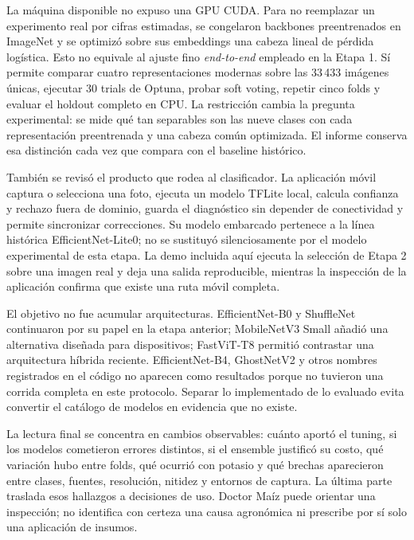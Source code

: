 La máquina disponible no expuso una GPU CUDA. Para no reemplazar un experimento
real por cifras estimadas, se congelaron backbones preentrenados en ImageNet y
se optimizó sobre sus embeddings una cabeza lineal de pérdida logística. Esto
no equivale al ajuste fino \emph{end-to-end} empleado en la Etapa 1. Sí permite
comparar cuatro representaciones modernas sobre las 33\,433 imágenes únicas,
ejecutar 30 trials de Optuna, probar soft voting, repetir cinco folds y evaluar
el holdout completo en CPU. La restricción cambia la pregunta experimental:
se mide qué tan separables son las nueve clases con cada representación
preentrenada y una cabeza común optimizada. El informe conserva esa distinción
cada vez que compara con el baseline histórico.

También se revisó el producto que rodea al clasificador. La aplicación móvil
captura o selecciona una foto, ejecuta un modelo TFLite local, calcula
confianza y rechazo fuera de dominio, guarda el diagnóstico sin depender de
conectividad y permite sincronizar correcciones. Su modelo embarcado pertenece
a la línea histórica EfficientNet-Lite0; no se sustituyó silenciosamente por el
modelo experimental de esta etapa. La demo incluida aquí ejecuta la selección
de Etapa 2 sobre una imagen real y deja una salida reproducible, mientras la
inspección de la aplicación confirma que existe una ruta móvil completa.

El objetivo no fue acumular arquitecturas. EfficientNet-B0 y ShuffleNet
continuaron por su papel en la etapa anterior; MobileNetV3 Small añadió una
alternativa diseñada para dispositivos; FastViT-T8 permitió contrastar una
arquitectura híbrida reciente. EfficientNet-B4, GhostNetV2 y otros nombres
registrados en el código no aparecen como resultados porque no tuvieron una
corrida completa en este protocolo. Separar lo implementado de lo evaluado
evita convertir el catálogo de modelos en evidencia que no existe.

La lectura final se concentra en cambios observables: cuánto aportó el tuning,
si los modelos cometieron errores distintos, si el ensemble justificó su costo,
qué variación hubo entre folds, qué ocurrió con potasio y qué brechas aparecieron
entre clases, fuentes, resolución, nitidez y entornos de captura. La última
parte traslada esos hallazgos a decisiones de uso. Doctor Maíz puede orientar
una inspección; no identifica con certeza una causa agronómica ni prescribe por
sí solo una aplicación de insumos.
